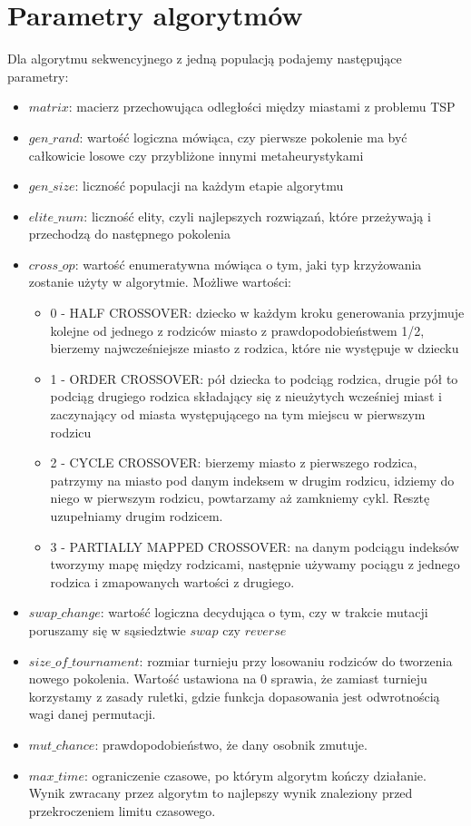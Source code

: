 \documentclass{article}
\begin{document}
\section{Parametry algorytmów}
Dla algorytmu sekwencyjnego z jedną populacją podajemy następujące parametry:
\begin{itemize}
\item $matrix$: macierz przechowująca odległości między miastami z problemu TSP
\item $gen\_rand$: wartość logiczna mówiąca, czy pierwsze pokolenie ma być całkowicie losowe czy przybliżone innymi metaheurystykami
\item $gen\_size$: liczność populacji na każdym etapie algorytmu
\item $elite\_num$: liczność elity, czyli najlepszych rozwiązań, które przeżywają i przechodzą do następnego pokolenia
\item $cross\_op$: wartość enumeratywna mówiąca o tym, jaki typ krzyżowania zostanie użyty w algorytmie. Możliwe wartości:
\begin{itemize}
\item 0 - HALF CROSSOVER: dziecko w każdym kroku generowania przyjmuje kolejne od jednego z rodziców miasto z prawdopodobieństwem 1/2, bierzemy najwcześniejsze miasto z rodzica, które nie występuje w dziecku
\item 1 - ORDER CROSSOVER: pół dziecka to podciąg rodzica, drugie pół to podciąg drugiego rodzica składający się z nieużytych wcześniej miast i zaczynający od miasta występującego na tym miejscu w pierwszym rodzicu
\item 2 - CYCLE CROSSOVER: bierzemy miasto z pierwszego rodzica, patrzymy na miasto pod danym indeksem w drugim rodzicu, idziemy do niego w pierwszym rodzicu, powtarzamy aż zamkniemy cykl. Resztę uzupełniamy drugim rodzicem.
\item 3 - PARTIALLY MAPPED CROSSOVER: na danym podciągu indeksów tworzymy mapę między rodzicami, następnie używamy pociągu z jednego rodzica i zmapowanych wartości z drugiego.
\end{itemize}
\item $swap\_change$: wartość logiczna decydująca o tym, czy w trakcie mutacji poruszamy się w sąsiedztwie $swap$ czy $reverse$
\item $size\_of\_tournament$: rozmiar turnieju przy losowaniu rodziców do tworzenia nowego pokolenia. Wartość ustawiona na 0 sprawia, że zamiast turnieju korzystamy z zasady ruletki, gdzie funkcja dopasowania jest odwrotnością wagi danej permutacji.
\item $mut\_chance$: prawdopodobieństwo, że dany osobnik zmutuje.
\item $max\_time$: ograniczenie czasowe, po którym algorytm kończy działanie. Wynik zwracany przez algorytm to najlepszy wynik znaleziony przed przekroczeniem limitu czasowego. 

\end{itemize}
\end{document}

